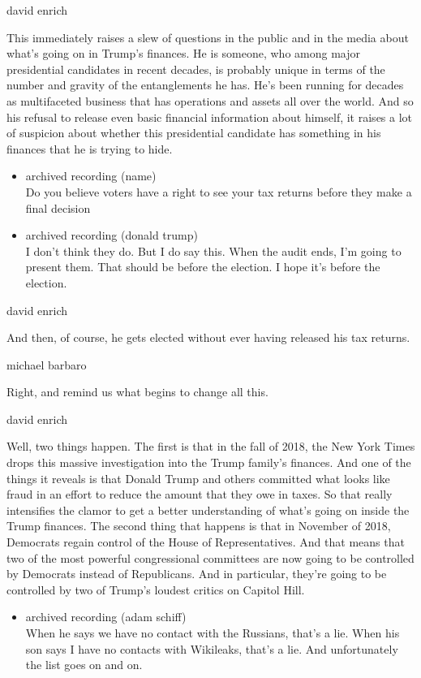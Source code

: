 david enrich

This immediately raises a slew of questions in the public and in the
media about what's going on in Trump's finances. He is someone, who
among major presidential candidates in recent decades, is probably
unique in terms of the number and gravity of the entanglements he has.
He's been running for decades as multifaceted business that has
operations and assets all over the world. And so his refusal to release
even basic financial information about himself, it raises a lot of
suspicion about whether this presidential candidate has something in his
finances that he is trying to hide.

\begin{itemize}
\item
  archived recording (name)\\
  Do you believe voters have a right to see your tax returns before they
  make a final decision
\item
  archived recording (donald trump)\\
  I don't think they do. But I do say this. When the audit ends, I'm
  going to present them. That should be before the election. I hope it's
  before the election.
\end{itemize}

david enrich

And then, of course, he gets elected without ever having released his
tax returns.

michael barbaro

Right, and remind us what begins to change all this.

david enrich

Well, two things happen. The first is that in the fall of 2018, the New
York Times drops this massive investigation into the Trump family's
finances. And one of the things it reveals is that Donald Trump and
others committed what looks like fraud in an effort to reduce the amount
that they owe in taxes. So that really intensifies the clamor to get a
better understanding of what's going on inside the Trump finances. The
second thing that happens is that in November of 2018, Democrats regain
control of the House of Representatives. And that means that two of the
most powerful congressional committees are now going to be controlled by
Democrats instead of Republicans. And in particular, they're going to be
controlled by two of Trump's loudest critics on Capitol Hill.

\begin{itemize}
\tightlist
\item
  archived recording (adam schiff)\\
  When he says we have no contact with the Russians, that's a lie. When
  his son says I have no contacts with Wikileaks, that's a lie. And
  unfortunately the list goes on and on.
\end{itemize}

